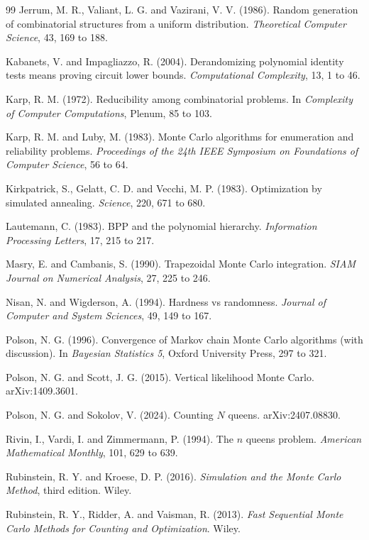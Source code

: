 \documentclass[11pt,twoside,openany]{book}
\theoremstyle{plain}
\theoremstyle{definition}
\theoremstyle{remark}
\begin{document}
\begin{thebibliography}{99}
 Jerrum, M. R., Valiant, L. G. and Vazirani, V. V. (1986). Random generation of combinatorial structures from a uniform distribution. \emph{Theoretical Computer Science}, 43, 169 to 188.

 Kabanets, V. and Impagliazzo, R. (2004). Derandomizing polynomial identity tests means proving circuit lower bounds. \emph{Computational Complexity}, 13, 1 to 46.

 Karp, R. M. (1972). Reducibility among combinatorial problems. In \emph{Complexity of Computer Computations}, Plenum, 85 to 103.

 Karp, R. M. and Luby, M. (1983). Monte Carlo algorithms for enumeration and reliability problems. \emph{Proceedings of the 24th IEEE Symposium on Foundations of Computer Science}, 56 to 64.

 Kirkpatrick, S., Gelatt, C. D. and Vecchi, M. P. (1983). Optimization by simulated annealing. \emph{Science}, 220, 671 to 680.

 Lautemann, C. (1983). BPP and the polynomial hierarchy. \emph{Information Processing Letters}, 17, 215 to 217.

 Masry, E. and Cambanis, S. (1990). Trapezoidal Monte Carlo integration. \emph{SIAM Journal on Numerical Analysis}, 27, 225 to 246.

 Nisan, N. and Wigderson, A. (1994). Hardness vs randomness. \emph{Journal of Computer and System Sciences}, 49, 149 to 167.

 Polson, N. G. (1996). Convergence of Markov chain Monte Carlo algorithms (with discussion). In \emph{Bayesian Statistics 5}, Oxford University Press, 297 to 321.

 Polson, N. G. and Scott, J. G. (2015). Vertical likelihood Monte Carlo. arXiv:1409.3601.

 Polson, N. G. and Sokolov, V. (2024). Counting $N$ queens. arXiv:2407.08830.

 Rivin, I., Vardi, I. and Zimmermann, P. (1994). The $n$ queens problem. \emph{American Mathematical Monthly}, 101, 629 to 639.

 Rubinstein, R. Y. and Kroese, D. P. (2016). \emph{Simulation and the Monte Carlo Method}, third edition. Wiley.

 Rubinstein, R. Y., Ridder, A. and Vaisman, R. (2013). \emph{Fast Sequential Monte Carlo Methods for Counting and Optimization}. Wiley.


\end{thebibliography}
\end{document}
